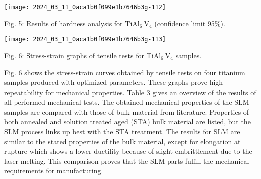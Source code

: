\documentclass[10pt]{article}
\begin{document}
\begin{center}
\texttt{[image: 2024\_03\_11\_0aca1b0f099e1b7646b3g-112]}
\end{center}

Fig. 5: Results of hardness analysis for $\mathrm{TiAl}_{6} \mathrm{~V}_{4}$ (confidence limit 95\%).

\begin{center}
\texttt{[image: 2024\_03\_11\_0aca1b0f099e1b7646b3g-113]}
\end{center}

Fig. 6: Stress-strain graphs of tensile tests for $\mathrm{TiAl}_{6} \mathrm{~V}_{4}$ samples.

Fig. 6 shows the stress-strain curves obtained by tensile tests on four titanium samples produced with optimized parameters. These graphs prove high repeatability for mechanical properties. Table 3 gives an overview of the results of all performed mechanical tests. The obtained mechanical properties of the SLM samples are compared with those of bulk material from literature. Properties of both annealed and solution treated aged (STA) bulk material are listed, but the SLM process links up best with the STA treatment. The results for SLM are similar to the stated properties of the bulk material, except for elongation at rupture which shows a lower ductility because of slight embrittlement due to the laser melting. This comparison proves that the SLM parts fulfill the mechanical requirements for manufacturing.
\end{document}
